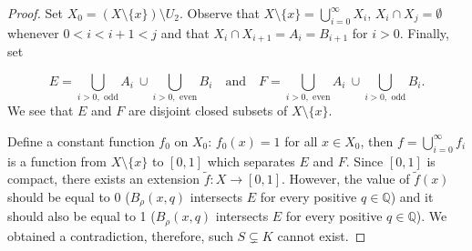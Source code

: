 \begin{proof}
    Set $X_0 = (X\setminus \{x\})\setminus U_2$. Observe that $X\setminus \{x\} = \bigcup_{i=0}^\infty X_i$, $X_i\cap X_j = \emptyset$ whenever $0<i<i+1<j$ and that $X_i\cap X_{i+1} = A_i = B_{i+1}$ for $i>0$.
    Finally, set

    $$ E = \bigcup_{i>0, \text{ odd}} A_i ~\cup \bigcup_{i>0, \text{ even}} B_i\quad\text{and}\quad F = \bigcup_{i>0, \text{ even}} A_i ~\cup \bigcup_{i>0, \text{ odd}} B_i. $$
    We see that $E$ and $F$ are disjoint closed subsets of $X\setminus \{x\}$.

    Define a constant function $f_0$ on $X_0$: $f_0(x) = 1$ for all $x\in X_0$, then $ f = \bigcup_{i=0}^{\infty} f_i $ is a function from $X\setminus \{x\}$ to $[0,1]$ which separates $E$ and $F$. Since $[0,1]$ is compact, there exists an extension $\tilde f\colon X \to [0,1]$. However, the value of $\tilde f(x)$ should be equal to 0 ($B_\rho(x,q)$ intersects $E$ for every positive $q\in \mathbb Q$) and it should also be equal to 1 ($B_\rho(x,q)$ intersects $E$ for every positive $q\in \mathbb Q$). We obtained a contradiction, therefore, such $S\subsetneq K$ cannot exist.
\end{proof}
